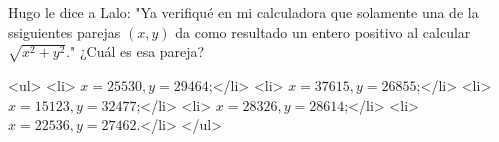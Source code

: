 Hugo le dice a Lalo: "Ya verifiqué en mi calculadora que solamente una de la ssiguientes parejas $(x,y)$ da como resultado un entero positivo al calcular $\sqrt{x^2+y^2}$." ¿Cuál es esa pareja?

<ul>
<li> $x = 25530, y = 29464$;</li>
<li> $x = 37615, y = 26855$;</li>
<li> $x = 15123, y = 32477$;</li>
<li> $x = 28326, y = 28614$;</li>
<li> $x = 22536, y = 27462$.</li>
</ul>